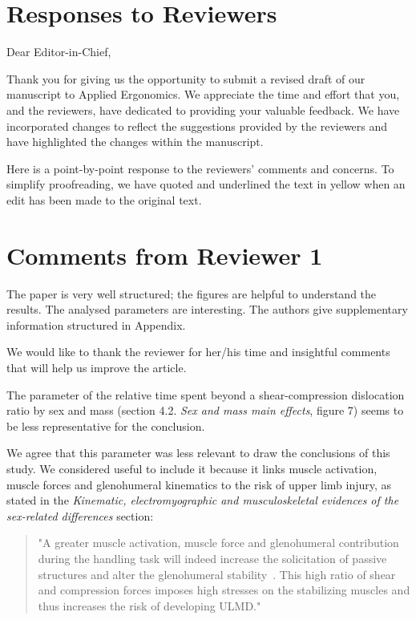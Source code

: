 \documentclass[preprint,review,12pt]{elsarticle}
\begin{document}
    \section*{Responses to Reviewers}
    \setcounter{section}{0}

    Dear Editor-in-Chief,

    Thank you for giving us the opportunity to submit a revised draft of our manuscript to Applied Ergonomics.
    We appreciate the time and effort that you, and the reviewers, have dedicated to providing your valuable feedback.
    We have incorporated changes to reflect the suggestions provided by the reviewers and have highlighted the changes within the manuscript.

    Here is a point-by-point response to the reviewers' comments and concerns.
    To simplify proofreading, we have quoted and underlined the text in yellow when an edit has been made to the original text.


    \section{Comments from Reviewer 1}\label{sec:reviewer-1}

    \begin{formal}
        The paper is very well structured;
        the figures are helpful to understand the results.
        The analysed parameters are interesting.
        The authors give supplementary information structured in Appendix.
    \end{formal}

    We would like to thank the reviewer for her/his time and insightful comments that will help us improve the article.

    \begin{formal}
        The parameter of the relative time spent beyond a shear-compression dislocation ratio by sex and mass (section 4.2. \textit{Sex and mass main effects}, figure 7) seems to be less representative for the conclusion.
    \end{formal}
    We agree that this parameter was less relevant to draw the conclusions of this study.
    We considered useful to include it because it links muscle activation, muscle forces and glenohumeral kinematics to the risk of upper limb injury, as stated in the \textit{Kinematic, electromyographic and musculoskeletal evidences of the sex-related differences} section:

    \begin{quote}
        "A greater muscle activation, muscle force and glenohumeral contribution during the handling task will indeed increase the solicitation of passive structures and alter the glenohumeral stability~\citep{Bergmann2007-zj}.
        This high ratio of shear and compression forces imposes high stresses on the stabilizing muscles and thus increases the risk of developing ULMD."
    \end{quote}
\end{document}
